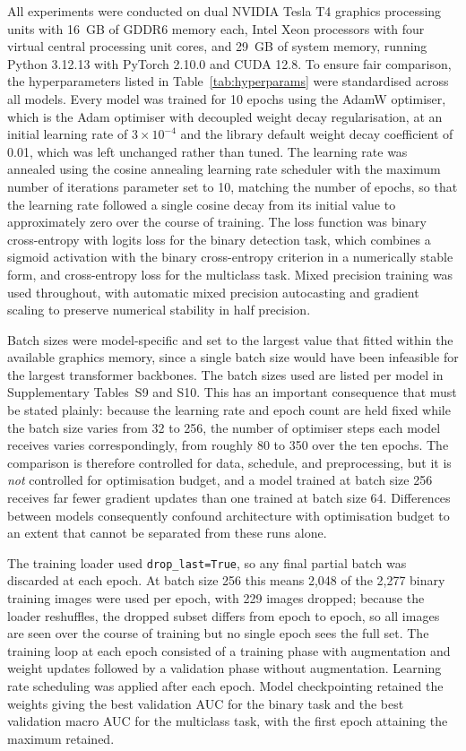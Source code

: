 \documentclass[final,3p,times,number]{elsarticle}
\begin{document}
All experiments were conducted on dual NVIDIA Tesla T4 graphics processing units with 16~GB of GDDR6 memory each, Intel Xeon processors with four virtual central processing unit cores, and 29~GB of system memory, running Python 3.12.13 with PyTorch 2.10.0 and CUDA 12.8. To ensure fair comparison, the hyperparameters listed in Table~\ref{tab:hyperparams} were standardised across all models. Every model was trained for 10 epochs using the AdamW optimiser, which is the Adam optimiser with decoupled weight decay regularisation, at an initial learning rate of $3\times 10^{-4}$ and the library default weight decay coefficient of 0.01, which was left unchanged rather than tuned. The learning rate was annealed using the cosine annealing learning rate scheduler with the maximum number of iterations parameter set to 10, matching the number of epochs, so that the learning rate followed a single cosine decay from its initial value to approximately zero over the course of training. The loss function was binary cross-entropy with logits loss for the binary detection task, which combines a sigmoid activation with the binary cross-entropy criterion in a numerically stable form, and cross-entropy loss for the multiclass task. Mixed precision training was used throughout, with automatic mixed precision autocasting and gradient scaling to preserve numerical stability in half precision.

Batch sizes were model-specific and set to the largest value that fitted within the available graphics memory, since a single batch size would have been infeasible for the largest transformer backbones. The batch sizes used are listed per model in Supplementary Tables~S9 and S10. This has an important consequence that must be stated plainly: because the learning rate and epoch count are held fixed while the batch size varies from 32 to 256, the number of optimiser steps each model receives varies correspondingly, from roughly 80 to 350 over the ten epochs. The comparison is therefore controlled for data, schedule, and preprocessing, but it is \emph{not} controlled for optimisation budget, and a model trained at batch size 256 receives far fewer gradient updates than one trained at batch size 64. Differences between models consequently confound architecture with optimisation budget to an extent that cannot be separated from these runs alone.

The training loader used \texttt{drop\_last=True}, so any final partial batch was discarded at each epoch. At batch size 256 this means 2,048 of the 2,277 binary training images were used per epoch, with 229 images dropped; because the loader reshuffles, the dropped subset differs from epoch to epoch, so all images are seen over the course of training but no single epoch sees the full set. The training loop at each epoch consisted of a training phase with augmentation and weight updates followed by a validation phase without augmentation. Learning rate scheduling was applied after each epoch. Model checkpointing retained the weights giving the best validation AUC for the binary task and the best validation macro AUC for the multiclass task, with the first epoch attaining the maximum retained.
\end{document}
